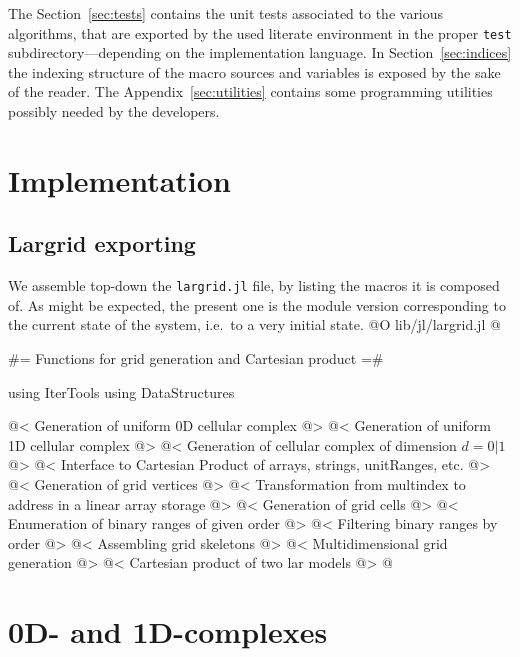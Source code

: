 The Section~\ref{sec:tests} contains the unit tests associated to the various algorithms, that are exported by the used literate environment in the proper \texttt{test} subdirectory---depending on the implementation language.
In Section~\ref{sec:indices} the indexing structure of the macro sources and variables is exposed by the sake of the reader. 
The Appendix~\ref{sec:utilities} contains some programming utilities possibly needed by the developers.



\section{Implementation}

\subsection{Largrid exporting}\label{sec:largrid}

We assemble top-down the \texttt{largrid.jl} file, by listing the macros it is composed of. 
As might be expected, the present one is the module version corresponding to the current state of the system, i.e.~to a very initial state.
@O lib/jl/largrid.jl
@{
#= Functions for grid generation and Cartesian product =#

using IterTools
using DataStructures

@< Generation of uniform 0D cellular complex  @>
@< Generation of uniform 1D cellular complex  @>
@< Generation of cellular complex of dimension $d = 0 | 1$ @>
@< Interface to Cartesian Product of arrays, strings, unitRanges, etc. @>
@< Generation of grid vertices  @>
@< Transformation from multindex to address in a linear array storage @>
@< Generation of grid cells  @>
@< Enumeration of binary ranges of given order @>
@< Filtering binary ranges by order @>
@< Assembling grid skeletons @>
@< Multidimensional grid generation @>
@< Cartesian product of two lar models   @>
@}


\section{0D- and 1D-complexes}\label{sec:0-1-complexes}

